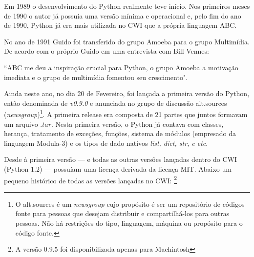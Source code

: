 Em 1989 o desenvolvimento do Python realmente teve início.
Nos primeiros meses de 1990 o autor já possuía uma versão mínima e operacional e, pelo fim do ano de 1990, Python já era mais utilizada no CWI que a própria linguagem ABC.
\par No ano de 1991 Guido foi transferido do grupo Amoeba para o grupo Multimídia.
De acordo com o próprio Guido em uma entrevista com Bill Vennes:
\begin{citacao}
    “ABC me deu a inspiração crucial para Python, o grupo Amoeba a motivação imediata e o grupo de multimídia fomentou seu crescimento".\cite{entrevistaGuido}
\end{citacao}
Ainda neste ano, no dia 20 de Fevereiro, foi lançada a primeira versão do Python, então denominada de \textit{v0.9.0} e anunciada no grupo de discussão alt.sources (\textit{newsgroup})\footnote{
    O alt.sources é um \textit{newsgroup} cujo propósito é ser um repositório de códigos fonte para pessoas que desejam distribuir e compartilhá-los para outras pessoas.
    Não há restrições do tipo, linguagem, máquina ou propósito para o código fonte.
}.
A primeira release era composta de 21 partes que juntos formavam um arquivo $.tar$. 
Nesta primeira versão, o Python já contava com classes, herança, tratamento de exceções, funções, sistema de módulos (empresado da linguagem Modula-3) e os tipos de dado nativos \textit{list, dict, str, e etc}.
\par Desde à primeira versão — e todas as outras versões lançadas dentro do CWI (Python 1.2) — possuíam uma licença derivada da licença MIT.
Abaixo um pequeno histórico de todas as versões lançadas no CWI:
\footnote{A versão 0.9.5 foi disponibilizada apenas para Machintosh}
